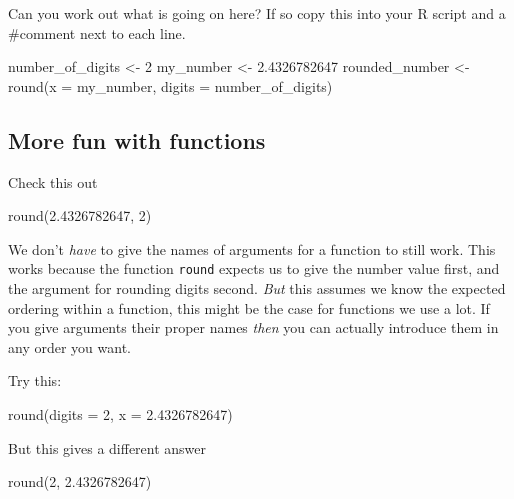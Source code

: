 \documentclass[
]{book}
\newenvironment{Shaded}{\begin{snugshade}}{\end{snugshade}}
\newcommand{\AttributeTok}[1]{\textcolor[rgb]{0.77,0.63,0.00}{#1}}
\newcommand{\DecValTok}[1]{\textcolor[rgb]{0.00,0.00,0.81}{#1}}
\newcommand{\FloatTok}[1]{\textcolor[rgb]{0.00,0.00,0.81}{#1}}
\newcommand{\FunctionTok}[1]{\textcolor[rgb]{0.00,0.00,0.00}{#1}}
\newcommand{\NormalTok}[1]{#1}
\newcommand{\OtherTok}[1]{\textcolor[rgb]{0.56,0.35,0.01}{#1}}
\begin{document}
Can you work out what is going on here? If so copy this into your R script and a \#comment next to each line.

\begin{Shaded}
\begin{Highlighting}[]
\NormalTok{number\_of\_digits }\OtherTok{\textless{}{-}} \DecValTok{2}
\NormalTok{my\_number }\OtherTok{\textless{}{-}} \FloatTok{2.4326782647}
\NormalTok{rounded\_number }\OtherTok{\textless{}{-}} \FunctionTok{round}\NormalTok{(}\AttributeTok{x  =}\NormalTok{ my\_number, }
                        \AttributeTok{digits =}\NormalTok{ number\_of\_digits)}
\end{Highlighting}
\end{Shaded}

\hypertarget{more-fun-with-functions}{%
\subsection{More fun with functions}\label{more-fun-with-functions}}

Check this out

\begin{Shaded}
\begin{Highlighting}[]
\FunctionTok{round}\NormalTok{(}\FloatTok{2.4326782647}\NormalTok{, }\DecValTok{2}\NormalTok{)}
\end{Highlighting}
\end{Shaded}

We don't \emph{have} to give the names of arguments for a function to still work. This works because the function \texttt{round} expects us to give the number value first, and the argument for rounding digits second. \emph{But} this assumes we know the expected ordering within a function, this might be the case for functions we use a lot. If you give arguments their proper names \emph{then} you can actually introduce them in any order you want.

Try this:

\begin{Shaded}
\begin{Highlighting}[]
\FunctionTok{round}\NormalTok{(}\AttributeTok{digits =} \DecValTok{2}\NormalTok{, }\AttributeTok{x  =} \FloatTok{2.4326782647}\NormalTok{)}
\end{Highlighting}
\end{Shaded}

But this gives a different answer

\begin{Shaded}
\begin{Highlighting}[]
\FunctionTok{round}\NormalTok{(}\DecValTok{2}\NormalTok{, }\FloatTok{2.4326782647}\NormalTok{)}
\end{Highlighting}
\end{Shaded}
\end{document}
